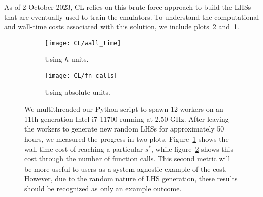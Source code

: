 

As of 2 October 2023, CL relies on this brute-force approach to build the
LHSs that are eventually used to train the emulators. To understand the 
computational and wall-time costs associated with this solution, we include 
plots~\ref{fig: function_calls} and~\ref{fig: wall_time}.

\begin{figure}[ht!]
    \begin{subfigure}{0.45 \textwidth}
    \centering
 		\texttt{[image: CL/wall\_time]}
 		\caption{Using $h$ units.}
 		\label{fig: wall_time}
    \end{subfigure}
    \begin{subfigure}{0.45 \textwidth}
    \centering
 		\texttt{[image: CL/fn\_calls]}
 		\caption{Using absolute units.}
 		\label{fig: function_calls}
    \end{subfigure}
        \centering
    \caption[Efficiency of Brute-Force LHS Approach]{We multithreaded our 
    		Python script to spawn 12 workers on an 11th-generation Intel
    		i7-11700 running at 2.50 GHz. After leaving the workers to generate
    		new random LHSs for approximately 50 hours, we measured the progress
    		in two plots. Figure~\ref{fig: wall_time} shows the wall-time cost of
    		reaching a particular $s^*$, while figure~\ref{fig: function_calls}
    		shows this cost through the number of function calls. This second
    		metric will be more useful to users as a system-agnostic example of
    		the cost. However, due to the random nature of LHS generation, these
    		results should be recognized as only an example outcome.}
    \label{fig: random_lhs_performance}
\end{figure}

\begin{comment} %
we left the system to run for two days. In this time, the 
largest minimum separation that we generated was approximately 0.08022.  
Recall from section sec_B1 that the theoretical best possible value for this 
setup is approximately 0.24183. It would have been more meaningful if you had 
counted the total number of function calls, but it isn’t too late to set up 
such a run. So, even after assigning a relatively large amount of compute to 
this brute force solution, we fail to obtain an LHC of even a third of the 
best minimum separation.
\end{comment} 

